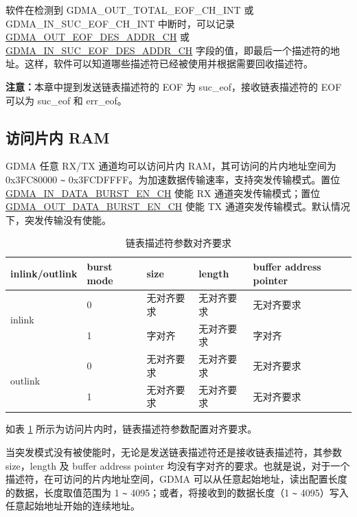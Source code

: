 \documentclass[main\_\_CN.tex]{subfiles}
\begin{document}
软件在检测到 GDMA\_OUT\_TOTAL\_EOF\_CH\_INT 或 GDMA\_IN\_SUC\_EOF\_CH\_INT 中断时，可以记录 \\\hyperref[fielddesc:GDMAOUTEOFDESADDRCHN]{GDMA\_OUT\_EOF\_DES\_ADDR\_CH} 或 \hyperref[fielddesc:GDMAINSUCEOFDESADDRCHN]{GDMA\_IN\_SUC\_EOF\_DES\_ADDR\_CH} 字段的值，即最后一个描述符的地址。这样，软件可以知道哪些描述符已经被使用并根据需要回收描述符。

{\bfseries 注意：}本章中提到发送链表描述符的 EOF 为 suc\_eof，接收链表描述符的 EOF 可以为 suc\_eof 和 err\_eof。

\subsection{访问片内 RAM}\label{sec:dma-access-inter-ram}
GDMA 任意 RX/TX 通道均可以访问片内 RAM，其可访问的片内地址空间为0x3FC80000 \verb+~+ 0x3FCDFFFF。为加速数据传输速率，支持突发传输模式。置位 \hyperref[fielddesc:GDMAINDATABURSTENCHN]{GDMA\_IN\_DATA\_BURST\_EN\_CH} 使能 RX 通道突发传输模式；置位 \hyperref[fielddesc:GDMAOUTDATABURSTENCHN]{GDMA\_OUT\_DATA\_BURST\_EN\_CH} 使能 TX 通道突发传输模式。默认情况下，突发传输没有使能。

\begin{longtable}[c]{ | l | l | l | l | l | }
    \caption{链表描述符参数对齐要求}
    \label{tab:gdma-inter-desc-param-align}
    \\\hline
    \rowcolor{lightgray}
    inlink/outlink & burst mode & size & length & buffer address pointer \\\hline

    \multirow{2}{*}{inlink}  & 0  & 无对齐要求 & 无对齐要求  & 无对齐要求 \\\cline{2-5} 
     & 1 & 字对齐   & 无对齐要求  & 字对齐 \\\hline
    \multirow{2}{*}{outlink} & 0  & 无对齐要求 & 无对齐要求  & 无对齐要求 \\\cline{2-5} 
     & 1 & 无对齐要求 & 无对齐要求  & 无对齐要求 \\\hline
\end{longtable}


如表 \ref{tab:gdma-inter-desc-param-align} 所示为访问片内时，链表描述符参数配置对齐要求。

当突发模式没有被使能时，无论是发送链表描述符还是接收链表描述符，其参数 size，length 及 buffer address pointer 均没有字对齐的要求。也就是说，对于一个描述符，在可访问的片内地址空间，GDMA 可以从任意起始地址，读出配置长度的数据，长度取值范围为 1 \verb+~+ 4095；或者，将接收到的数据长度（1 \verb+~+ 4095）写入任意起始地址开始的连续地址。
\end{document}
